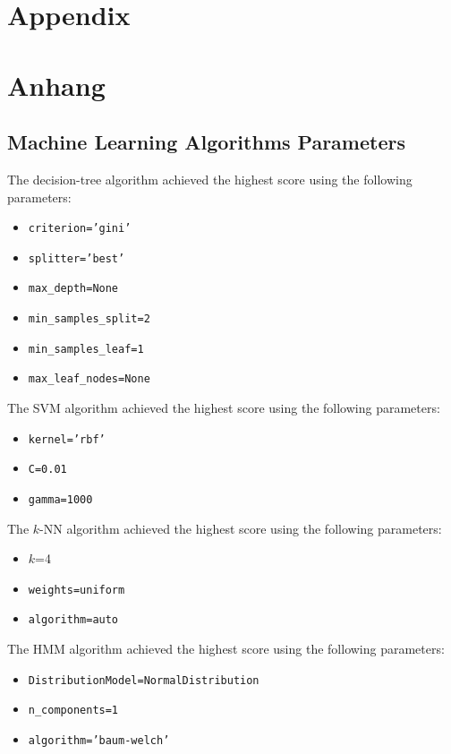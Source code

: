 

{\chapter{Appendix}}    %
{\chapter{Anhang}}      %
\label{chap:appendix}











\section{Machine Learning Algorithms Parameters}
\label{sec:appendix:mlparameters}
The decision-tree algorithm achieved the highest score using the following parameters:
\begin{itemize}
	\item \texttt{criterion='gini'}
	\item \texttt{splitter='best'}
	\item \texttt{max\_depth=None}
	\item \texttt{min\_samples\_split=2}
	\item \texttt{min\_samples\_leaf=1}
	\item \texttt{max\_leaf\_nodes=None}
\end{itemize}
The SVM algorithm achieved the highest score using the following parameters:
\begin{itemize}
	\item \texttt{kernel='rbf'}
	\item \texttt{C=0.01}
	\item \texttt{gamma=1000}
\end{itemize}
The $k$-NN algorithm achieved the highest score using the following parameters:
\begin{itemize}
	\item $k$=4
	\item \texttt{weights=uniform}
	\item \texttt{algorithm=auto}
\end{itemize}
The HMM algorithm achieved the highest score using the following parameters:
\begin{itemize}
	\item \texttt{DistributionModel=NormalDistribution}
	\item \texttt{n\_components=1}
	\item \texttt{algorithm='baum-welch'}
\end{itemize}

